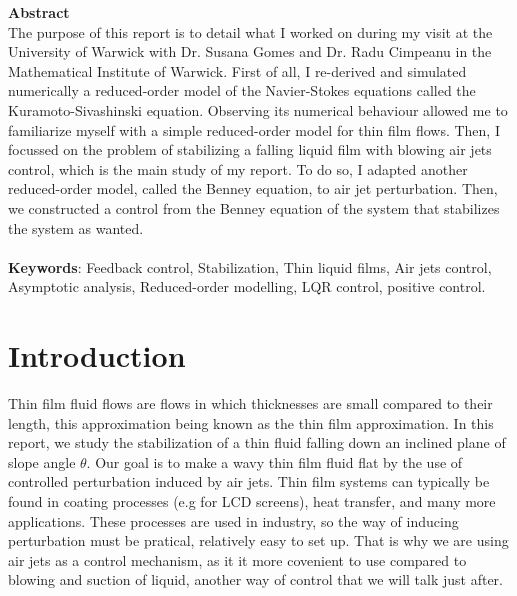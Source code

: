 \documentclass[12pt]{article}
\begin{document}
{\large \textbf{Abstract}} \\
{\normalsize The purpose of this report is to detail what I worked on during my visit at the 
University of Warwick with Dr. Susana Gomes and Dr. Radu Cimpeanu in the Mathematical Institute
 of Warwick. First of all, I re-derived and simulated numerically a reduced-order model of the 
 Navier-Stokes equations called the Kuramoto-Sivashinski equation. Observing its numerical behaviour
  allowed me to familiarize myself with a simple reduced-order model for thin film flows. Then, I 
  focussed on the problem of stabilizing a falling liquid film with blowing air jets control, 
  which is the main study of my report. To do so, I adapted another reduced-order model, called 
  the Benney equation, to air jet perturbation. Then, we constructed a control from the Benney 
  equation of the system that stabilizes the system as wanted.} \\
\vspace{0.8cm} \\
{\large \textbf{Keywords}: \normalsize Feedback control, Stabilization, Thin liquid films, Air jets control, Asymptotic analysis, Reduced-order modelling, LQR control, positive control.}


\newpage
\tableofcontents
\newpage



\section{Introduction}
Thin film fluid flows are flows in which thicknesses are small compared to their length, this approximation being known as the
 thin film approximation. In this report, we study the stabilization of a thin fluid falling down an inclined plane of 
 slope angle $\theta$. Our goal is to make a wavy thin film fluid flat by the use of controlled perturbation 
 induced by air jets. Thin film systems can typically be found in coating processes (e.g for LCD screens), heat transfer,
  and many more applications. These processes are used in industry, so the way of inducing perturbation must be pratical, 
  relatively easy to set up. That is why we are using air jets as a control mechanism, as it it more covenient to use compared to
  blowing and suction of liquid, another way of control that we will talk just after.  \\
\end{document}
